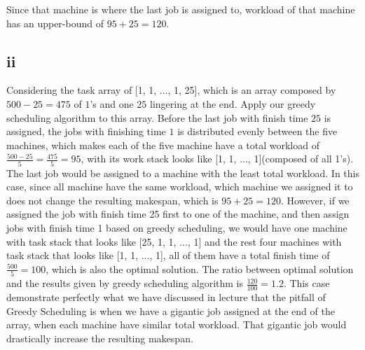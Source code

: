 \documentclass[11pt]{article}
\begin{document}
Since that machine is where the last job is assigned to, workload of that machine has an upper-bound of $95 + 25 = 120$.

\subsection*{ii} \noindent
Considering the task array of [1, 1, ..., 1, 25], which is an array composed by $500 - 25 = 475$ of $1$'s and one $25$ 
lingering at the end. Apply our greedy scheduling algorithm to this array. Before the last job with finish time $25$ is assigned, 
the jobs with finishing time $1$ is distributed evenly between the five machines, which makes each of the five machine have a 
total workload of $\frac{500 - 25}{5} = \frac{475}{5} = 95$, with its work stack looks like [1, 1, ..., 1](composed of all 1's).
\newline
The last job would be assigned to a machine with the least total workload. In this case, since all machine have the same workload, 
which machine we assigned it to does not change the resulting makespan, which is $95 + 25 = 120$.
\newline
However, if we assigned the job with finish time 25 first to one of the machine, and then assign jobs with finish time 1 based on 
greedy scheduling, we would have one machine with task stack that looks like [25, 1, 1, ..., 1] and the rest four machines with task 
stack that looks like [1, 1, ..., 1], all of them have a total finish time of $\frac{500}{5} = 100$, which is also the optimal solution.
\newline
The ratio between optimal solution and the results given by greedy scheduling algorithm is $\frac{120}{100} = 1.2$. 
\newline
This case demonstrate perfectly what we have discussed in lecture that the pitfall of Greedy Scheduling is when we have a gigantic 
job assigned at the end of the array, when each machine have similar total workload. That gigantic job would drastically increase the 
resulting makespan. 
\end{document}
